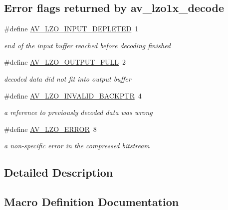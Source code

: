 \subsection*{Error flags returned by av\+\_\+lzo1x\+\_\+decode}
\begin{DoxyCompactItemize}
\item 
\#define \hyperlink{group__lavu__lzo_ga5f66b9a81147a79b747deb6ccacb3ad5}{A\+V\+\_\+\+L\+Z\+O\+\_\+\+I\+N\+P\+U\+T\+\_\+\+D\+E\+P\+L\+E\+T\+ED}~1
\begin{DoxyCompactList}\small\item\em end of the input buffer reached before decoding finished \end{DoxyCompactList}\item 
\#define \hyperlink{group__lavu__lzo_ga400c6aec6aeca19117fb9ff6f6d30325}{A\+V\+\_\+\+L\+Z\+O\+\_\+\+O\+U\+T\+P\+U\+T\+\_\+\+F\+U\+LL}~2
\begin{DoxyCompactList}\small\item\em decoded data did not fit into output buffer \end{DoxyCompactList}\item 
\#define \hyperlink{group__lavu__lzo_ga6acd84bec8181fecb2861f8c7eb57cc1}{A\+V\+\_\+\+L\+Z\+O\+\_\+\+I\+N\+V\+A\+L\+I\+D\+\_\+\+B\+A\+C\+K\+P\+TR}~4
\begin{DoxyCompactList}\small\item\em a reference to previously decoded data was wrong \end{DoxyCompactList}\item 
\#define \hyperlink{group__lavu__lzo_gad8076b8656b50ac499d0f18bf887ed13}{A\+V\+\_\+\+L\+Z\+O\+\_\+\+E\+R\+R\+OR}~8
\begin{DoxyCompactList}\small\item\em a non-\/specific error in the compressed bitstream \end{DoxyCompactList}\end{DoxyCompactItemize}


\subsection{Detailed Description}


\subsection{Macro Definition Documentation}
